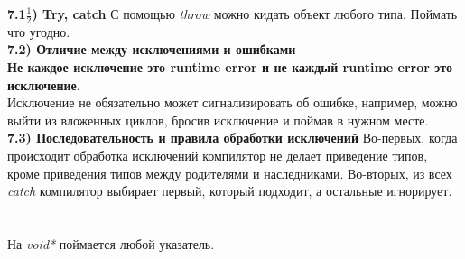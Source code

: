 \documentclass{article}
\begin{document}
\noindent \textbf{7.1$\frac{1}{2}$) Try, catch}
С помощью \textit{throw} можно кидать объект любого типа.
Поймать что угодно.\\
\noindent \textbf{7.2) Отличие между исключениями и ошибками}\\
\textbf{Не каждое исключение это runtime error и не каждый runtime error это исключение}.\\
Исключение не обязательно может сигнализировать об ошибке, например, можно выйти из вложенных циклов, бросив исключение и поймав в нужном месте.\\
\noindent \textbf{7.3) Последовательность и правила обработки исключений}
Во-первых, когда происходит обработка исключений компилятор не делает приведение типов, кроме приведения типов между родителями и наследниками. Во-вторых, из всех \textit{catch} компилятор выбирает первый, который подходит, а остальные игнорирует.\\\\\\
На \textit{void*} поймается любой указатель.
\end{document}
